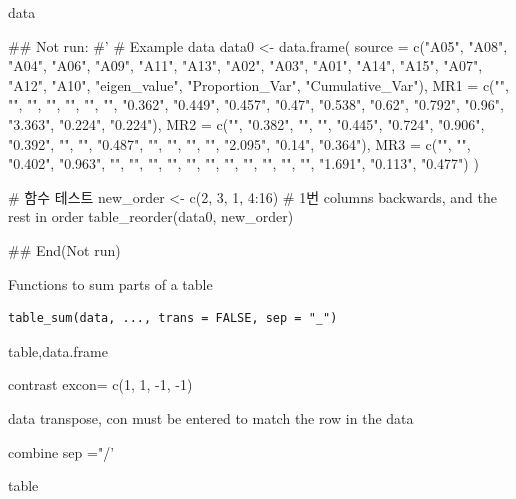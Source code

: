 \documentclass[a4paper]{book}
\begin{document}
%
\begin{Value}
data
\end{Value}
%
\begin{Examples}
\begin{ExampleCode}

\#\# Not run: 
#'
# Example data
data0 <- data.frame(
  source = c("A05", "A08", "A04", "A06",
  "A09", "A11", "A13", "A02", "A03", "A01",
  "A14", "A15", "A07", "A12", "A10",
  "eigen_value", "Proportion_Var", "Cumulative_Var"),
  MR1 = c("", "", "", "", "", "", "", "0.362",
  "0.449", "0.457", "0.47", "0.538", "0.62",
  "0.792", "0.96", "3.363", "0.224", "0.224"),
  MR2 = c("", "0.382", "", "", "0.445", "0.724",
  "0.906", "0.392", "", "", "0.487", "", "", "",
   "", "2.095", "0.14", "0.364"),
  MR3 = c("", "", "0.402", "0.963", "", "", "",
  "", "", "", "", "", "", "", "", "1.691",
  "0.113", "0.477")
)

# 함수 테스트
new_order <- c(2, 3, 1, 4:16)
# 1번 columns backwards, and the rest in order
table_reorder(data0, new_order)

## End(Not run)

\end{ExampleCode}
\end{Examples}
%
\begin{Description}
Functions to sum parts of a table
\end{Description}
%
\begin{Usage}
\begin{verbatim}
table_sum(data, ..., trans = FALSE, sep = "_")
\end{verbatim}
\end{Usage}
%
\begin{Arguments}
\begin{ldescription}
\item[\code{data}] table,data.frame

\item[\code{...}] contrast excon= c(1, 1, -1, -1)

\item[\code{trans}] data transpose, con must be entered to match the row in the data

\item[\code{sep}] combine sep ="/'
\end{ldescription}
\end{Arguments}
%
\begin{Value}
table
\end{Value}
\end{document}
